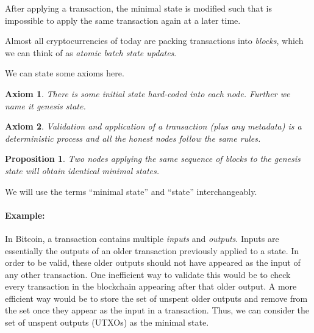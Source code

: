 \documentclass[]{report}   %
\newtheorem{axiom}{Axiom}
\newtheorem{proposition}{Proposition}
\begin{document}
	After applying a transaction, the minimal state is modified such that is impossible to apply the same transaction again at a later time. 

	Almost all cryptocurrencies of today are packing transactions into \textit{blocks}, which we can think of as \textit{atomic batch state updates}. 

   We can state some axioms here.

	\begin{axiom}
	 There is some initial state hard-coded into each node. Further we name it \textit{genesis state}.
	\end{axiom}

    \begin{axiom} 
     Validation and application of a transaction (plus any metadata) is a deterministic process and all the honest nodes follow the same rules. 
    \end{axiom}

	\begin{proposition}\label{prop1} Two nodes applying the same sequence of blocks to the genesis state will obtain identical minimal states.
	\end{proposition}	

We will use the terms ``minimal state'' and ``state'' interchangeably. 


\paragraph{Example:} In Bitcoin, a transaction contains multiple \textit{inputs} and \textit{outputs}. Inputs are essentially the outputs of an older transaction previously applied to a state. In order to be valid, these older outputs should not have appeared as the input of any other transaction. One inefficient way to validate this would be to check every transaction in the blockchain appearing after that older output. A more efficient way would be to store the set of unspent older outputs and remove from the set once they appear as the input in a transaction.
Thus, %
we can consider the set of unspent outputs (UTXOs) as the minimal state.
\end{document}

